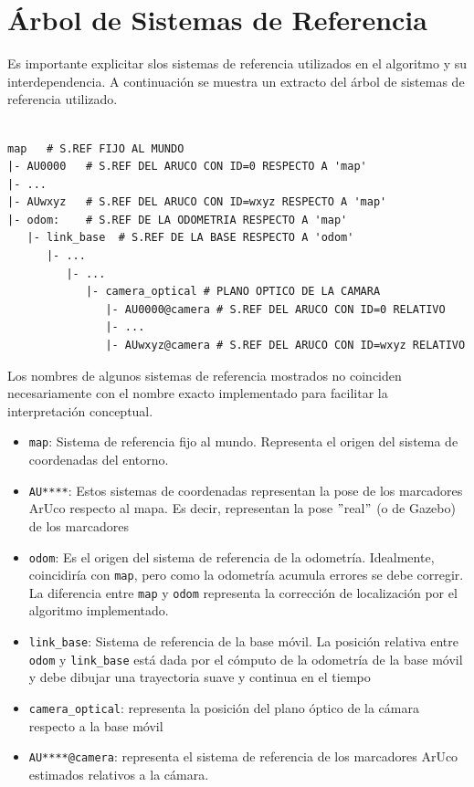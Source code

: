 \documentclass[12pt, a4paper]{report}
\begin{document}
			\section{Árbol de Sistemas de Referencia}\label{sec:algoritmo-localizacion/arbol-sist-ref}
				Es importante explicitar slos sistemas de referencia utilizados en el algoritmo y su interdependencia.
				A continuación se muestra un extracto del árbol de sistemas de referencia utilizado.
				\begin{Verbatim}[baselinestretch=0.1,label={verb:tftree}]

map   # S.REF FIJO AL MUNDO
|- AU0000   # S.REF DEL ARUCO CON ID=0 RESPECTO A 'map'
|- ...
|- AUwxyz   # S.REF DEL ARUCO CON ID=wxyz RESPECTO A 'map'
|- odom:    # S.REF DE LA ODOMETRIA RESPECTO A 'map'
   |- link_base  # S.REF DE LA BASE RESPECTO A 'odom'
      |- ...
         |- ...
            |- camera_optical # PLANO OPTICO DE LA CAMARA
               |- AU0000@camera # S.REF DEL ARUCO CON ID=0 RELATIVO
               |- ...
               |- AUwxyz@camera # S.REF DEL ARUCO CON ID=wxyz RELATIVO
				\end{Verbatim}
				Los nombres de algunos sistemas de referencia mostrados no coinciden necesariamente con el nombre exacto implementado para facilitar la interpretación conceptual.
				\begin{itemize}
					\item \texttt{map}: Sistema de referencia fijo al mundo.
					Representa el origen del sistema de coordenadas del entorno.
					\item \texttt{AU****}: Estos sistemas de coordenadas representan la pose de los marcadores ArUco respecto al mapa.
					Es decir, representan la pose \("\)real\("\) (o de Gazebo) de los marcadores
					\item \texttt{odom}: Es el origen del sistema de referencia de la odometría.
					Idealmente, coincidiría con \texttt{map}, pero como la odometría acumula errores se debe corregir.
					La diferencia entre \texttt{map} y \texttt{odom} representa la corrección de localización por el algoritmo implementado.
					\item \texttt{link\_base}: Sistema de referencia de la base móvil.
					La posición relativa entre \texttt{odom} y \texttt{link\_base} está dada por el cómputo de la odometría de la base móvil y debe dibujar una trayectoria suave y continua en el tiempo
					\item \texttt{camera\_optical}: representa la posición del plano óptico de la cámara respecto a la base móvil
					\item \texttt{AU****@camera}: representa el sistema de referencia de los marcadores ArUco estimados relativos a la cámara.
				\end{itemize}
\end{document}
